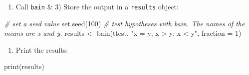 \documentclass[
]{book}
\newenvironment{Shaded}{\begin{snugshade}}{\end{snugshade}}
\newcommand{\AttributeTok}[1]{\textcolor[rgb]{0.77,0.63,0.00}{#1}}
\newcommand{\CommentTok}[1]{\textcolor[rgb]{0.56,0.35,0.01}{\textit{#1}}}
\newcommand{\ConstantTok}[1]{\textcolor[rgb]{0.00,0.00,0.00}{#1}}
\newcommand{\DecValTok}[1]{\textcolor[rgb]{0.00,0.00,0.81}{#1}}
\newcommand{\FunctionTok}[1]{\textcolor[rgb]{0.00,0.00,0.00}{#1}}
\newcommand{\NormalTok}[1]{#1}
\newcommand{\OtherTok}[1]{\textcolor[rgb]{0.56,0.35,0.01}{#1}}
\newcommand{\SpecialCharTok}[1]{\textcolor[rgb]{0.00,0.00,0.00}{#1}}
\newcommand{\StringTok}[1]{\textcolor[rgb]{0.31,0.60,0.02}{#1}}
\providecommand{\tightlist}{%
  \setlength{\itemsep}{0pt}\setlength{\parskip}{0pt}}
\begin{document}
\begin{Shaded}
\end{Shaded}

\begin{enumerate}
\def\labelenumi{\arabic{enumi})}
\setcounter{enumi}{1}
\tightlist
\item
  Call \texttt{bain} \& 3) Store the output in a \texttt{results} object:
\end{enumerate}

\begin{Shaded}
\begin{Highlighting}[]
\CommentTok{\# set a seed value}
\FunctionTok{set.seed}\NormalTok{(}\DecValTok{100}\NormalTok{)}
\CommentTok{\# test hypotheses with bain. The names of the means are x and y.}
\NormalTok{results }\OtherTok{\textless{}{-}} \FunctionTok{bain}\NormalTok{(ttest, }\StringTok{"x = y; x \textgreater{} y; x \textless{} y"}\NormalTok{, }\AttributeTok{fraction =} \DecValTok{1}\NormalTok{)}
\end{Highlighting}
\end{Shaded}

\begin{enumerate}
\def\labelenumi{\arabic{enumi})}
\setcounter{enumi}{2}
\tightlist
\item
  Print the results:
\end{enumerate}

\begin{Shaded}
\begin{Highlighting}[]
\FunctionTok{print}\NormalTok{(results)}
\end{Highlighting}
\end{Shaded}
\end{document}
